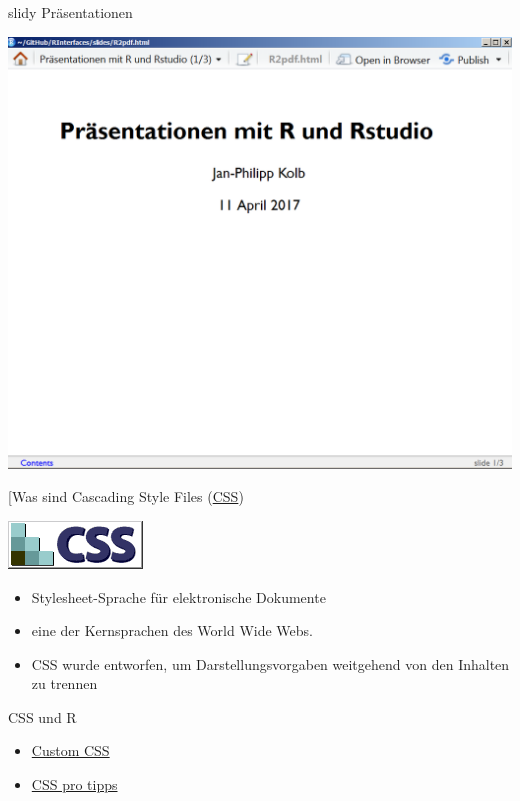 \documentclass[ignorenonframetext,]{beamer}
\providecommand{\tightlist}{%
\setlength{\itemsep}{0pt}\setlength{\parskip}{0pt}}
\begin{document}
\begin{frame}{slidy Präsentationen}

\includegraphics{./tex2pdf.956/6db7d2fb260418f59639684762690933ca3da69f.png}

\end{frame}

\begin{frame}{{[}Was sind Cascading Style Files
(\href{https://de.wikipedia.org/wiki/Cascading_Style_Sheets}{CSS})}

\includegraphics{./tex2pdf.956/4a856d597d45801bad27c8d4bb2cb6abbc229bda.png}

\begin{itemize}
\tightlist
\item
  Stylesheet-Sprache für elektronische Dokumente
\item
  eine der Kernsprachen des World Wide Webs.
\item
  CSS wurde entworfen, um Darstellungsvorgaben weitgehend von den
  Inhalten zu trennen
\end{itemize}

\begin{block}{CSS und R}

\begin{itemize}
\tightlist
\item
  \href{http://rmarkdown.rstudio.com/html_document_format.html\#custom_css}{Custom
  CSS}
\item
  \href{https://github.com/AllThingsSmitty/css-protips\#use-a-css-reset}{CSS
  pro tipps}
\end{itemize}

\end{block}

\end{frame}
\end{document}
